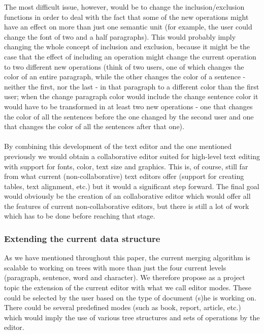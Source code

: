 The most difficult issue, however, would be to change the inclusion/exclusion functions in
order to deal with the fact that some of the new operations might have an effect on more than
just one semantic unit (for example, the user could change the font of two and a half paragraphs).
This would probably imply changing the whole concept of inclusion and exclusion, because it might
be the case that the effect of including an operation might change the current operation to
two different new operations (think of two users, one of which changes the color of an entire
paragraph, while the other changes the color of a sentence - neither the first, nor the last -
in that paragraph to a different color than the first user; when the change paragraph color
would include the change sentence color it would have to be transformed in at least two new
operations - one that changes the color of all the sentences before the one changed by the
second user and one that changes the color of all the sentences after that one).\\
\\
By combining this development of the text editor and the one mentioned previously we would
obtain a collaborative editor suited for high-level text editing with support for fonts, color,
text size and graphics. This is, of course, still far from what current (non-collaborative)
text editors offer (support for creating tables, text alignment, etc.) but it would a significant
step forward. The final goal would obviously be the creation of an collaborative editor which
would offer all the features of current non-collaborative editors, but there is still a lot
of work which has to be done before reaching that stage.

\subsubsection{Extending the current data structure}

As we have mentioned throughout this paper, the current merging algorithm is scalable to
working on trees with more than just the four current levels (paragraph, sentence, word
and character). We therefore propose as a project topic the extension of the current editor
with what we call editor modes. These could be selected by the user based on the type of
document (s)he is working on. There could be several predefined modes (such as book, report,
article, etc.) which would imply the use of various tree structures and sets of operations
by the editor.

